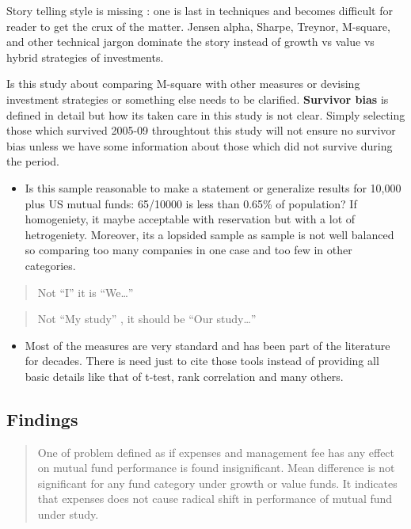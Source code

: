 \documentclass[]{tufte-handout}
\providecommand{\tightlist}{%
  \setlength{\itemsep}{0pt}\setlength{\parskip}{0pt}}
\begin{document}
Story telling style is missing : one is last in techniques and becomes
difficult for reader to get the crux of the matter. Jensen alpha,
Sharpe, Treynor, M-square, and other technical jargon dominate the story
instead of growth vs value vs hybrid strategies of investments.

Is this study about comparing M-square with other measures or devising
investment strategies or something else needs to be clarified.
\textbf{Survivor bias} is defined in detail but how its taken care in
this study is not clear. Simply selecting those which survived 2005-09
throughtout this study will not ensure no survivor bias unless we have
some information about those which did not survive during the period.

\begin{itemize}
\tightlist
\item
  Is this sample reasonable to make a statement or generalize results
  for 10,000 plus US mutual funds: 65/10000 is less than 0.65\% of
  population? If homogeniety, it maybe acceptable with reservation but
  with a lot of hetrogeniety. Moreover, its a lopsided sample as sample
  is not well balanced so comparing too many companies in one case and
  too few in other categories.
\end{itemize}

\begin{quote}
Not ``I'' it is ``We\ldots{}''
\end{quote}

\begin{quote}
Not ``My study'' , it should be ``Our study\ldots{}''
\end{quote}

\begin{itemize}
\tightlist
\item
  Most of the measures are very standard and has been part of the
  literature for decades. There is need just to cite those tools instead
  of providing all basic details like that of t-test, rank correlation
  and many others.
\end{itemize}

\hypertarget{findings}{%
\subsection{Findings}\label{findings}}

\begin{quote}
One of problem defined as if expenses and management fee has any effect
on mutual fund performance is found insignificant. Mean difference is
not significant for any fund category under growth or value funds. It
indicates that expenses does not cause radical shift in performance of
mutual fund under study.
\end{quote}
\end{document}
